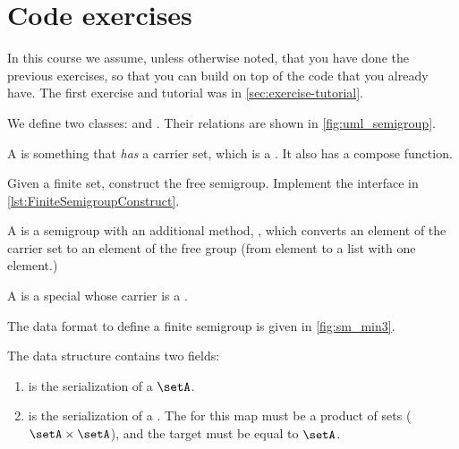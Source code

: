 \section{\usebox{\chaptergear}
  Code exercises}

\begin{remark}
    In this course we assume, unless otherwise noted, that you have done the previous exercises, so that you can build on top of the code that you already have.
    The first exercise and tutorial was in \cref{sec:exercise-tutorial}.
\end{remark}

\begin{figure*}[b]
    \label{fig:uml_semigroup}
\end{figure*}

We define two classes: \Semigroup and \FiniteSemigroup.
Their relations are shown in \cref{fig:uml_semigroup}.

A \Semigroup is something that \emph{has} a carrier set, which is a \Setoid.
It also has a compose function.


\begin{codeexercise}
    \label{ex:TestFiniteSemigroupConstruct}
    Given a finite set, construct the free semigroup.
    Implement the interface in \cref{lst:FiniteSemigroupConstruct}.
\end{codeexercise}


A \FreeSemigroup is a semigroup with an additional method, , which converts an element of the carrier set to an element of the free group (\eg from element to a list with one element.)


A \FiniteSemigroup is a special \Semigroup whose carrier is a \FiniteSet.


\begin{marginfigure}%
    \caption{}%
    \label{fig:sm_min3}%
\end{marginfigure}%

The data format to define a finite semigroup is given in \cref{fig:sm_min3}.

The data structure contains two fields:
\begin{enumerate}
    \item {} is the serialization of a \FiniteSet $\setA$.
    \item {} is the serialization of a \FiniteMap.
          The  for this map must be a product of sets ($\setA \times \setA$), and the target must be equal to $\setA$.
\end{enumerate}

